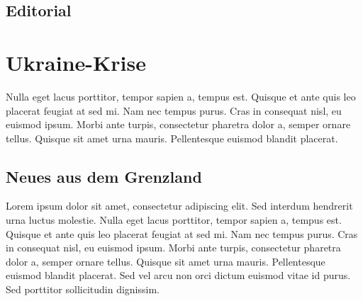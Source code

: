 \documentclass{freistuz}
\begin{document}
 
\renewcommand{\contentsname}{Inhalt}

\begin{multicols}{2}


\tableofcontents
	\vfill
	\columnbreak
\section{Editorial}
\blindtext[1]
\end{multicols}

\section{Ukraine-Krise}
\begin{multicols}{2}
Nulla eget lacus porttitor, tempor sapien a, tempus est. Quisque et ante quis leo placerat feugiat at sed mi. Nam nec tempus purus. Cras in consequat nisl, eu euismod ipsum. Morbi ante turpis, consectetur pharetra dolor a, semper ornare tellus. Quisque sit amet urna mauris. Pellentesque euismod blandit placerat.
\subsection{Neues aus dem Grenzland}
Lorem ipsum dolor sit amet, consectetur adipiscing elit. Sed interdum hendrerit urna luctus molestie. Nulla eget lacus porttitor, tempor sapien a, tempus est. Quisque et ante quis leo placerat feugiat at sed mi. Nam nec tempus purus. Cras in consequat nisl, eu euismod ipsum. Morbi ante turpis, consectetur pharetra dolor a, semper ornare tellus. Quisque sit amet urna mauris. Pellentesque euismod blandit placerat. Sed vel arcu non orci dictum euismod vitae id purus. Sed porttitor sollicitudin dignissim. 

\end{multicols}
\end{document}
